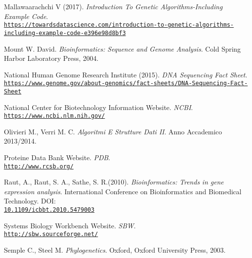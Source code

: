 \documentclass[twoside,openright,titlepage,fleqn,
,	headinclude,12pt,a4paper,BCOR5mm,footinclude,table]{scrbook}
\newcommand{\?}{'\-\nobreak\hspace{0pt}}
\begin{document}
\begin{thebibliography}{60}
Mallawaarachchi V (2017).\newline
\textit{Introduction To Genetic Algorithms-Including Example Code}.
\\\texttt{\url{https://towardsdatascience.com/introduction-to-genetic-algorithms-including-example-code-e396e98d8bf3}}

Mount W. David.\newline
\textit{Bioinformatics: Sequence and Genome Analysis}.\newline
Cold Spring Harbor Laboratory Press, 2004.

National Human Genome Research Institute (2015).\newline
\textit{DNA Sequencing Fact Sheet}.
\\\texttt{\url{https://www.genome.gov/about-genomics/fact-sheets/DNA-Sequencing-Fact-Sheet}}

National Center for Biotechnology Information Website.\newline
\textit{NCBI}.
\\\texttt{\url{https://www.ncbi.nlm.nih.gov/}}

Olivieri M., Verri M. C.\newline
\textit{Algoritmi E Strutture Dati II}.\newline
Anno Accademico 2013/2014.

Proteine Data Bank Website.\newline
\textit{PDB}.
\\\texttt{\url{http://www.rcsb.org/}}

Raut, A., Raut, S. A., Sathe, S. R.(2010). \newline
\textit{Bioinformatics: Trends in gene expression analysis}.\newline
International Conference on Bioinformatics and Biomedical Technology.\newline
DOI:\\\texttt{\url{10.1109/icbbt.2010.5479003}}

Systems Biology Workbench Website.\newline
\textit{SBW}.
\\\texttt{\url{http://sbw.sourceforge.net/}}

Semple C., Steel M.\newline
\textit{Phylogenetics}.\newline
Oxford, Oxford University Press, 2003.


\end{thebibliography}
\end{document}
